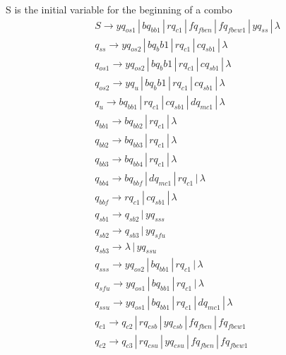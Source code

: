 \documentclass{article}
\begin{document}
\begin{mylist}
\begin{table}[h]
\begin{tabular}{l | l}
  \end{tabular}
\end{table}
S is the initial variable for the beginning of a combo
\begin{align*}
&S \rightarrow yq_{os1} \, | \, bq_{bb1} \, | \, rq_{c1} \, | \, fq_{fben} \, | \, fq_{fbew1} \, | \, yq_{ss} \, | \, \lambda \\
&q_{ss} \rightarrow yq_{os2} \, | \, b{q_bb1} \, | \, rq_{c1} \, | \, cq_{sb1} \, | \, \lambda\\
&q_{os1} \rightarrow yq_{os2} \, | \, b{q_bb1} \, | \, rq_{c1} \, | \, cq_{sb1} \, | \, \lambda\\
&q_{os2} \rightarrow yq_{u} \, | \, b{q_bb1} \, | \, rq_{c1} \, | \, cq_{sb1} \, | \, \lambda\\
&q_{u} \rightarrow bq_{bb1} \, | \, rq_{c1} \, | \,cq_{sb1} \, | \, dq_{mc1} \, | \, \lambda\\
&q_{bb1} \rightarrow bq_{bb2} \, | \, rq_{c1} \, | \, \lambda \\ 
&q_{bb2} \rightarrow bq_{bb3} \, | \, rq_{c1} \, | \, \lambda \\ 
&q_{bb3} \rightarrow bq_{bb4} \, | \, rq_{c1} \, | \, \lambda \\ 
&q_{bb4} \rightarrow bq_{bbf} \, | \, dq_{mc1} \, | \, rq_{c1} \, | \, \lambda \\ 
&q_{bbf} \rightarrow rq_{c1} \, | \, cq_{sb1} \, | \, \lambda \\ 
&q_{sb1} \rightarrow q_{sb2} \, | \, yq_{sss} \\ 
&q_{sb2} \rightarrow q_{sb3} \, | \, yq_{sfu} \\ 
&q_{sb3} \rightarrow \lambda \, | \, yq_{ssu} \\ 
&q_{sss} \rightarrow yq_{os2} \, | \, bq_{bb1} \, | \, rq_{c1} \, | \, \lambda\\ 
&q_{sfu} \rightarrow yq_{os1} \, | \, bq_{bb1} \, | \, rq_{c1} \, | \, \lambda\\ 
&q_{ssu} \rightarrow yq_{os1} \, | \, bq_{bb1} \, | \, rq_{c1} \, | \, dq_{mc1}\, | \, \lambda\\ 
&q_{c1} \rightarrow q_{c2} \, | \,  rq_{csb} \, | \, yq_{csb} \, | \, fq_{fben} \, | \, fq_{fbew1}\\ 
&q_{c2} \rightarrow q_{c3} \, | \,  rq_{csu} \, | \, yq_{csu} \, | \, fq_{fben} \, | \, fq_{fbew1}\\ 

\end{align*}
\end{mylist}
\end{document}
